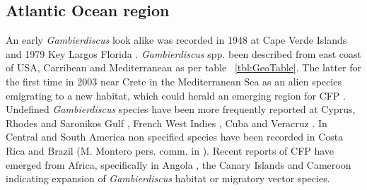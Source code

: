 \documentclass[12pt]{article}
\begin{document}
\subsection{Atlantic Ocean region}
An early \emph{Gambierdiscus} look alike was recorded in 1948 at Cape Verde Islands \cite{silva1956contribution} and 1979 Key Largos Florida \cite{taylor1979description}.
\emph{Gambierdiscus} spp. been described from east coast of USA, Carribean and Mediterranean as per table ~\ref{tbl:GeoTable}. The latter for the first time in 2003 near Crete in the Mediterranean Sea as an alien species emigrating to a new habitat, which could herald an emerging region for CFP \cite{aligizaki2008morphological,zenetos2009aquatic}.
Undefined \emph{Gambierdiscus} species have been more frequently reported at Cyprus, Rhodes and Saronikos Gulf \cite{aligizaki2009toxic,aligizaki2010diversity}, French West Indies \cite{lobel1988assessment}, Cuba \cite{delgado2006epiphytic} and Veracruz \cite{okolodkov2007seasonal}.
In Central and South America non specified species have been recorded in Costa Rica and Brazil (M. Montero pers. comm. in \cite{parsons2012gambierdiscus}).
Recent reports of CFP have emerged from Africa, specifically in Angola \cite{berdalet2012global}, the Canary Islands \cite{boada2010ciguatera} and Cameroon \cite{bienfang2008ciguatera} indicating expansion of \emph{Gambierdiscus} habitat or migratory vector species. %
\end{document}
